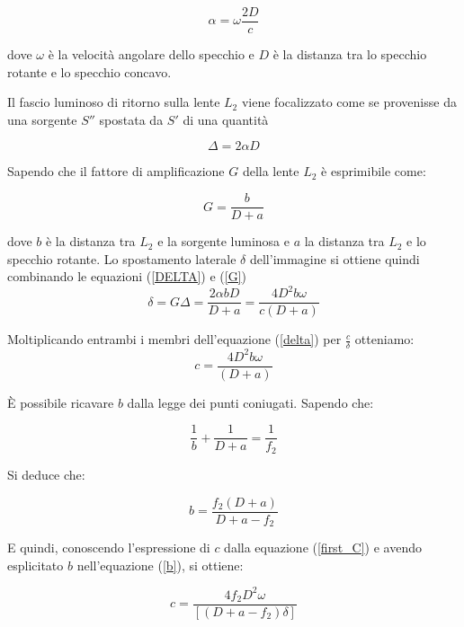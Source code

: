 \documentclass{article}
\begin{document}
\begin{equation}
\alpha = \omega \frac{2D}{c}
\end{equation}

dove $\omega$ è la velocità angolare dello specchio e $D$ è la distanza tra lo specchio rotante e lo specchio concavo.

Il fascio luminoso di ritorno sulla lente $L_2$ viene focalizzato come se provenisse da una sorgente $S''$ spostata da $S'$ di una quantità 

\begin{equation}
\Delta = 2 \alpha D
\label{DELTA}
\end{equation}

Sapendo che il fattore di amplificazione $G$ della lente $L_2$ è esprimibile come:

\begin{equation}
G=\frac{b}{D+a}
\label{G}
\end{equation}

dove $b$ è la distanza tra $L_2$ e la sorgente luminosa e $a$  la distanza tra $L_2$ e lo specchio rotante. Lo spostamento laterale $\delta$ dell'immagine si ottiene quindi
combinando le equazioni (\ref{DELTA}) e (\ref{G})
\begin{equation}
\delta = G\Delta =\frac{2\alpha b D}{D + a}=\frac{4 D^2 b \omega}{c(D+a)}
\label{delta}
\end{equation}

Moltiplicando entrambi i membri dell'equazione (\ref{delta}) per $\frac{c}{\delta}$ otteniamo:
\begin{equation}
    c=\frac{4D^2b\omega}{(D+a)}
    \label{first_C}
\end{equation}

È possibile ricavare $b$ dalla legge dei punti coniugati. Sapendo che:

\begin{equation}
\frac{1}{b}+\frac{1}{D+a}=\frac{1}{f_2}
\label{punticoniug}
\end{equation}

Si deduce che:

\begin{equation}
b=\frac{f_2(D+a)}{D+a-f_2}
\label{b}
\end{equation}

E quindi, conoscendo l'espressione di $c$ dalla equazione (\ref{first_C}) e avendo esplicitato $b$ nell'equazione (\ref{b}), si ottiene:

\begin{equation}
c = \frac{4f_2D^2\omega}{[(D+a-f_2)\delta]}
\label{c_nodiff}
\end{equation}
\end{document}
